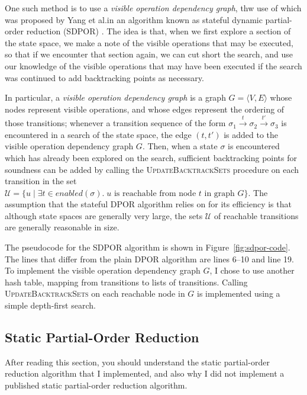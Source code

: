 \documentclass[12pt,a4paper,twoside,openright]{report}
\begin{document}
One such method is to use a \emph{visible operation dependency
graph}, thw use of which was proposed by Yang et al.\@ in an
algorithm known as stateful dynamic
partial-order reduction (SDPOR) \cite{yang08}.
The idea is that, when we first explore
a section of the state space,
we make a note of the visible operations
that may be executed, so that if we encounter that section again,
we can cut short the search, and use our knowledge of the
visible operations that may have been
executed if the search was continued
to add backtracking points as necessary.

In particular, a \emph{visible operation dependency
graph} is a graph $G = \langle V, E \rangle$ whose
nodes represent visible operations, and whose edges
represent the ordering of those transitions; whenever
a transition sequence of the form
$\sigma_1 \xrightarrow{t} \sigma_2 \xrightarrow{t'}
 \sigma_3$
is encountered in a search of the state space, the
edge $(t, t')$ is added to the visible operation
dependency graph $G$. Then, when a state $\sigma$ is
encountered which has already been explored on the
search, sufficient backtracking points for soundness
can be added by calling the
\textsc{UpdateBacktrackSets} procedure
on each transition in the set
$\mathcal{U} = \{u \mid \exists t \in \textit{enabled}(\sigma).\;
   u \text{ is reachable from node } t \text{ in graph } G\}$.
The assumption that the stateful DPOR algorithm 
relies on for its efficiency is that
although state spaces are generally very large,
the sets $\mathcal{U}$ of reachable transitions
are generally reasonable in size.

The pseudocode for the SDPOR algorithm is shown
in Figure~\ref{fig:sdpor-code}. The lines that
differ from the plain DPOR algorithm are lines
6--10 and line 19.
To implement the visible operation dependency graph
$G$, I chose to use another hash table,
mapping from transitions to lists of transitions.
Calling \textsc{UpdateBacktrackSets} on
each reachable node in $G$ is implemented using
a simple depth-first search.



\subsection{Static Partial-Order Reduction}
\label{sec:spor-imp}
After reading this section, you should
understand the static partial-order
reduction algorithm that I implemented,
and also why I did not implement a
published static partial-order reduction
algorithm.
\end{document}
